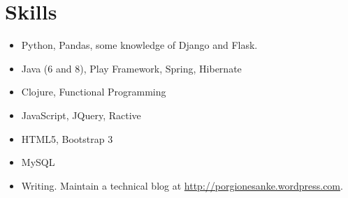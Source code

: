 \documentclass{moderncv}
\begin{document}



\section{Skills}
\begin{itemize}
\item Python, Pandas, some knowledge of Django and Flask.
\item Java (6 and 8), Play Framework, Spring, Hibernate
\item Clojure, Functional Programming
\item JavaScript, JQuery, Ractive
\item HTML5, Bootstrap 3
\item MySQL
\item Writing. Maintain a technical blog at \href{http://porgionesanke.wordpress.com}{http://porgionesanke.wordpress.com}.
\end{itemize}
\end{document}
